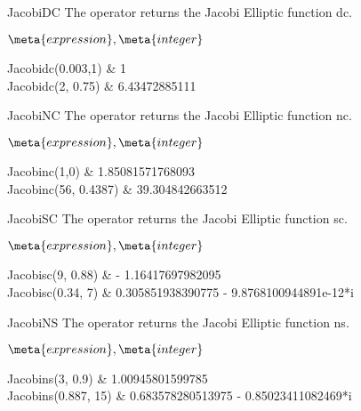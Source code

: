 \begin{Operator}{JacobiDC}
The  operator returns the Jacobi Elliptic function dc.

\begin{Syntax}
\(\meta{expression},\meta{integer}\)
\end{Syntax}

\begin{Examples}
Jacobidc(0.003,1)        & 1 \\
Jacobidc(2, 0.75)        & 6.43472885111  \\
\end{Examples}

\end{Operator}

\begin{Operator}{JacobiNC}
The  operator returns the Jacobi Elliptic function nc.

\begin{Syntax}
\(\meta{expression},\meta{integer}\)
\end{Syntax}

\begin{Examples}
Jacobinc(1,0)           & 1.85081571768093 \\
Jacobinc(56, 0.4387)    & 39.304842663512  \\
\end{Examples}

\end{Operator}

\begin{Operator}{JacobiSC}
The  operator returns the Jacobi Elliptic function sc.

\begin{Syntax}
\(\meta{expression},\meta{integer}\)
\end{Syntax}

\begin{Examples}
Jacobisc(9, 0.88)        &  - 1.16417697982095  \\
Jacobisc(0.34, 7)        & 0.305851938390775 - 9.8768100944891e-12*i \\
\end{Examples}

\end{Operator}

\begin{Operator}{JacobiNS}
The  operator returns the Jacobi Elliptic function ns.

\begin{Syntax}
\(\meta{expression},\meta{integer}\)
\end{Syntax}

\begin{Examples}
Jacobins(3, 0.9)         & 1.00945801599785 \\
Jacobins(0.887, 15)      & 0.683578280513975 - 0.85023411082469*i \\
\end{Examples}

\end{Operator}

